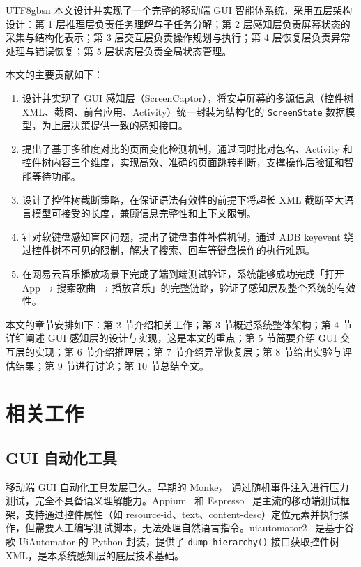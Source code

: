 \documentclass{article}
\begin{document}
\begin{CJK}{UTF8}{gbsn}
本文设计并实现了一个完整的移动端 GUI 智能体系统，采用五层架构设计：第 1 层推理层负责任务理解与子任务分解；第 2 层感知层负责屏幕状态的采集与结构化表示；第 3 层交互层负责操作规划与执行；第 4 层恢复层负责异常处理与错误恢复；第 5 层状态层负责全局状态管理。

本文的主要贡献如下：

\begin{enumerate}[leftmargin=1.5em]
  \item 设计并实现了 GUI 感知层（ScreenCaptor），将安卓屏幕的多源信息（控件树 XML、截图、前台应用、Activity）统一封装为结构化的 \texttt{ScreenState} 数据模型，为上层决策提供一致的感知接口。
  \item 提出了基于多维度对比的页面变化检测机制，通过同时比对包名、Activity 和控件树内容三个维度，实现高效、准确的页面跳转判断，支撑操作后验证和智能等待功能。
  \item 设计了控件树截断策略，在保证语法有效性的前提下将超长 XML 截断至大语言模型可接受的长度，兼顾信息完整性和上下文限制。
  \item 针对软键盘感知盲区问题，提出了键盘事件补偿机制，通过 ADB keyevent 绕过控件树不可见的限制，解决了搜索、回车等键盘操作的执行难题。
  \item 在网易云音乐播放场景下完成了端到端测试验证，系统能够成功完成「打开 App → 搜索歌曲 → 播放音乐」的完整链路，验证了感知层及整个系统的有效性。
\end{enumerate}

本文的章节安排如下：第 2 节介绍相关工作；第 3 节概述系统整体架构；第 4 节详细阐述 GUI 感知层的设计与实现，这是本文的重点；第 5 节简要介绍 GUI 交互层的实现；第 6 节介绍推理层；第 7 节介绍异常恢复层；第 8 节给出实验与评估结果；第 9 节进行讨论；第 10 节总结全文。

\section{相关工作}
\label{sec:related_work}

\subsection{GUI 自动化工具}

移动端 GUI 自动化工具发展已久。早期的 Monkey~\cite{monkey} 通过随机事件注入进行压力测试，完全不具备语义理解能力。Appium~\cite{appium} 和 Espresso~\cite{espresso} 是主流的移动端测试框架，支持通过控件属性（如 resource-id、text、content-desc）定位元素并执行操作，但需要人工编写测试脚本，无法处理自然语言指令。uiautomator2~\cite{uiautomator2} 是基于谷歌 UiAutomator 的 Python 封装，提供了 \texttt{dump\_hierarchy()} 接口获取控件树 XML，是本系统感知层的底层技术基础。


\end{CJK}
\end{document}
